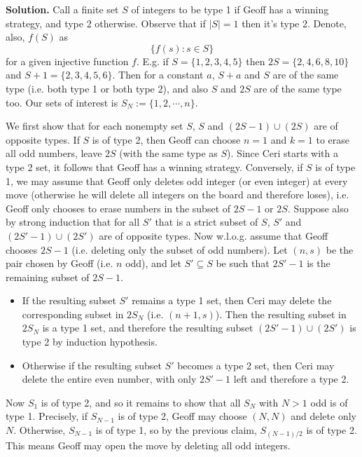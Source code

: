 \documentclass[11pt,a4paper]{article}
\begin{document}
\begin{enumerate}
    	\textbf{Solution.} Call a finite set $S$ of integers to be type 1 if Geoff has a winning strategy, and type 2 otherwise. 
    	Observe that if $|S|=1$ then it's type 2. 
    	Denote, also, $f(S)$ as 
    	\[
    	\{f(s): s\in S\}
    	\]
    	for a given injective function $f$. 
    	E.g. if $S=\{1,2,3,4,5\}$ then $2S=\{2,4,6,8,10\}$ and $S+1=\{2,3,4,5,6\}$. 
    	Then for a constant $a$, $S+a$ and $S$ are of the same type 
    	(i.e. both type 1 or both type 2), and also $S$ and $2S$ are of the same type too. 
    	Our sets of interest is $S_N := \{1, 2, \cdots, n\}$. 
    	
    	We first show that for each nonempty set $S$, 
    	$S$ and $(2S - 1)\cup(2S)$ are of opposite types. 
    	If $S$ is of type 2, then Geoff can choose $n = 1$ and $k = 1$ to erase all odd numbers, leave $2S$ (with the same type as $S$). 
    	Since Ceri starts with a type 2 set, it follows that Geoff has a winning strategy. 
    	Conversely, if $S$ is of type 1, we may assume that Geoff only deletes odd integer (or even integer) at every move 
    	(otherwise he will delete all integers on the board and therefore loses), i.e. Geoff only chooses to erase numbers in the subset of $2S - 1$ or $2S$. 
    	Suppose also by strong induction that for all $S'$ that is a strict subset of $S$, 
    	$S'$ and $(2S' - 1)\cup(2S')$ are of opposite types. 
    	Now w.l.o.g. assume that Geoff chooses $2S - 1$ (i.e. deleting only the subset of odd numbers). 
    	Let $(n, s)$ be the pair chosen by Geoff (i.e. $n$ odd), 
    	and let $S'\subseteq S$ be such that $2S'-1$ is the remaining subset of $2S-1$. 
    	\begin{itemize}
    		\item If the resulting subset $S'$ remains a type 1 set, then Ceri may delete the corresponding subset in $2S_N$ (i.e. $(n + 1, s)$). 
    		Then the resulting subset in $2S_N$ is a type 1 set, 
    		and therefore the resulting subset $(2S' - 1)\cup(2S')$ is type 2 by induction hypothesis. 
    		
    		\item Otherwise if the resulting subset $S'$ becomes a type 2 set, then Ceri may delete the entire even number, with only $2S'-1$ left and therefore a type 2. 
    	\end{itemize}
    	
    	Now $S_1$ is of type 2, and so it remains to show that all $S_N$ with $N > 1$ odd is of type 1. 
    	Precisely, if $S_{N-1}$ is of type 2, Geoff may choose $(N, N)$ and delete only $N$. 
    	Otherwise, $S_{N-1}$ is of type 1, 
    	so by the previous claim, $S_{(N-1)/2}$ is of type 2. 
    	This means Geoff may open the move by deleting all odd integers. 
    	

\end{enumerate}
\end{document}
